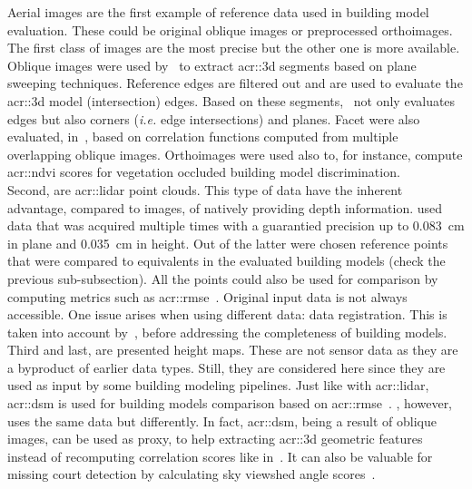             Aerial images are the first example of reference data used in building model evaluation.
            These could be original oblique images or preprocessed orthoimages.
            The first class of images are the most precise but the other one is more available.
            Oblique images were used by~\textcite{michelin2013quality} to extract \gls{acr::3d} segments based on plane sweeping techniques.
            Reference edges are filtered out and are used to evaluate the \gls{acr::3d} model (intersection) edges.
            Based on these segments,~\textcite{boudet2006supervised} not only evaluates edges but also corners (\textit{i.e.} edge intersections) and planes.
            Facet were also evaluated, in~\parencite{boudet2006supervised}, based on correlation functions computed from multiple overlapping oblique images.
            Orthoimages were used also to, for instance, compute \gls{acr::ndvi} scores for vegetation occluded building model discrimination.\\
            Second, are \gls{acr::lidar} point clouds.
            This type of data have the inherent advantage, compared to images, of natively providing depth information.
            \textcite{kaartinen2005accuracy} used data that was acquired multiple times with a guarantied precision up to \SI{0.083}{\cm} in plane and \SI{0.035}{\cm} in height.
            Out of the latter were chosen reference points that were compared to equivalents in the evaluated building models (check the previous sub-subsection).
            All the points could also be used for comparison by computing metrics such as \gls{acr::rmse}~\parencite{lafarge_ijcv12,zhu2018large}.
            Original input data is not always accessible.
            One issue arises when using different data: data registration.
            This is taken into account by~\textcite{akca2010quality}, before addressing the completeness of building models.\\
            Third and last, are presented height maps.
            These are not sensor data as they are a byproduct of earlier data types.
            Still, they are considered here since they are used as input by some building modeling pipelines.
            Just like with \gls{acr::lidar}, \gls{acr::dsm} is used for building models comparison based on \gls{acr::rmse}~\parencite{zeng2018neural}.
            \textcite{michelin2013quality}, however, uses the same data but differently.
            In fact, \gls{acr::dsm}, being a result of oblique images, can be used as proxy, to help extracting \gls{acr::3d} geometric features instead of recomputing correlation scores like in~\parencite{boudet2006supervised}.
            It can also be valuable for missing court detection by calculating sky viewshed angle scores~\parencite{michelin2013quality}.

